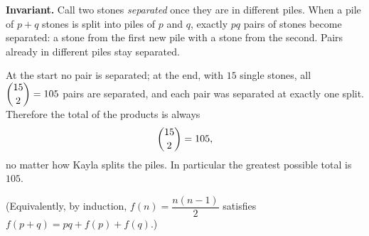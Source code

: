 \textbf{Invariant.} Call two stones \emph{separated} once they are in different piles. When a pile of $p+q$ stones is split into piles of $p$ and $q$, exactly $pq$ pairs of stones become separated: a stone from the first new pile with a stone from the second. Pairs already in different piles stay separated.

At the start no pair is separated; at the end, with $15$ single stones, all $\dbinom{15}{2}=105$ pairs are separated, and each pair was separated at exactly one split. Therefore the total of the products is always
\[
\dbinom{15}{2}=105,
\]
no matter how Kayla splits the piles. In particular the greatest possible total is $\boxed{105}$.

(Equivalently, by induction, $f(n)=\dfrac{n(n-1)}{2}$ satisfies $f(p+q)=pq+f(p)+f(q)$.)
